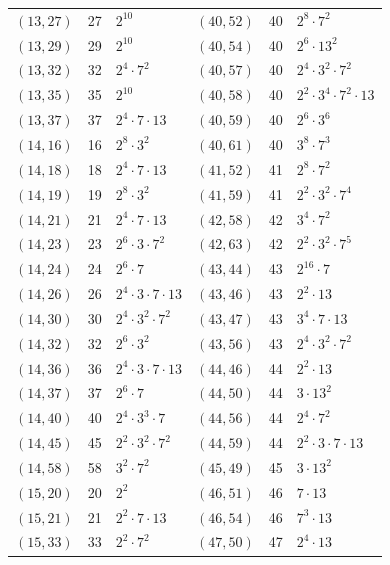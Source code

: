 \documentclass[11pt]{article}
\begin{document}
\begin{longtable}{@{}lrl@{\qquad}lrl@{}}
$(13,27)$ & 27 & $2^{10}$ & $(40,52)$ & 40 & $2^{8}\cdot 7^{2}$\\
$(13,29)$ & 29 & $2^{10}$ & $(40,54)$ & 40 & $2^{6}\cdot 13^{2}$\\
$(13,32)$ & 32 & $2^{4}\cdot 7^{2}$ & $(40,57)$ & 40 & $2^{4}\cdot 3^{2}\cdot 7^{2}$\\
$(13,35)$ & 35 & $2^{10}$ & $(40,58)$ & 40 & $2^{2}\cdot 3^{4}\cdot 7^{2}\cdot 13$\\
$(13,37)$ & 37 & $2^{4}\cdot 7\cdot 13$ & $(40,59)$ & 40 & $2^{6}\cdot 3^{6}$\\
$(14,16)$ & 16 & $2^{8}\cdot 3^{2}$ & $(40,61)$ & 40 & $3^{8}\cdot 7^{3}$\\
$(14,18)$ & 18 & $2^{4}\cdot 7\cdot 13$ & $(41,52)$ & 41 & $2^{8}\cdot 7^{2}$\\
$(14,19)$ & 19 & $2^{8}\cdot 3^{2}$ & $(41,59)$ & 41 & $2^{2}\cdot 3^{2}\cdot 7^{4}$\\
$(14,21)$ & 21 & $2^{4}\cdot 7\cdot 13$ & $(42,58)$ & 42 & $3^{4}\cdot 7^{2}$\\
$(14,23)$ & 23 & $2^{6}\cdot 3\cdot 7^{2}$ & $(42,63)$ & 42 & $2^{2}\cdot 3^{2}\cdot 7^{5}$\\
$(14,24)$ & 24 & $2^{6}\cdot 7$ & $(43,44)$ & 43 & $2^{16}\cdot 7$\\
$(14,26)$ & 26 & $2^{4}\cdot 3\cdot 7\cdot 13$ & $(43,46)$ & 43 & $2^{2}\cdot 13$\\
$(14,30)$ & 30 & $2^{4}\cdot 3^{2}\cdot 7^{2}$ & $(43,47)$ & 43 & $3^{4}\cdot 7\cdot 13$\\
$(14,32)$ & 32 & $2^{6}\cdot 3^{2}$ & $(43,56)$ & 43 & $2^{4}\cdot 3^{2}\cdot 7^{2}$\\
$(14,36)$ & 36 & $2^{4}\cdot 3\cdot 7\cdot 13$ & $(44,46)$ & 44 & $2^{2}\cdot 13$\\
$(14,37)$ & 37 & $2^{6}\cdot 7$ & $(44,50)$ & 44 & $3\cdot 13^{2}$\\
$(14,40)$ & 40 & $2^{4}\cdot 3^{3}\cdot 7$ & $(44,56)$ & 44 & $2^{4}\cdot 7^{2}$\\
$(14,45)$ & 45 & $2^{2}\cdot 3^{2}\cdot 7^{2}$ & $(44,59)$ & 44 & $2^{2}\cdot 3\cdot 7\cdot 13$\\
$(14,58)$ & 58 & $3^{2}\cdot 7^{2}$ & $(45,49)$ & 45 & $3\cdot 13^{2}$\\
$(15,20)$ & 20 & $2^{2}$ & $(46,51)$ & 46 & $7\cdot 13$\\
$(15,21)$ & 21 & $2^{2}\cdot 7\cdot 13$ & $(46,54)$ & 46 & $7^{3}\cdot 13$\\
$(15,33)$ & 33 & $2^{2}\cdot 7^{2}$ & $(47,50)$ & 47 & $2^{4}\cdot 13$\\

\end{longtable}
\end{document}
